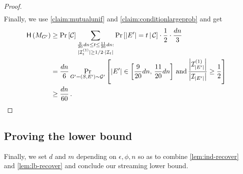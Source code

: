 \documentclass[epsfig,letter,11pt]{article}
\numberwithin{equation}{section}
\newcommand{\I}{\mathcal{I}}
\newcommand*{\entropy}{\textup{\textsf{H}}}
\begin{document}
\begin{proof}
\begin{align*}
		\end{align*}
		Finally, we use \cref{claim:mutualunif} and  \cref{claim:conditionlargeprob} and get
		\begin{align*}
			 	\entropy\left(M_{G'}\right) & \ge \Pr\left[  \mathcal{C} \right]     \sum_{\substack{\frac{9}{20}dn \le t \le  \frac{11}{20}dn:\\ |\mathcal{I}^{(1)}_{t}| \ge {1}/{2} \cdot |\mathcal{I}_t| } } \Pr\left[|E'|=t \, \middle| \, \mathcal{C} \right] \cdot \frac{1}{2} \cdot  \frac{dn}{3}  \\
			 	& =  \frac{dn}{6} \Pr_{G'=(S,E') \sim \mathcal{G}'}\left[  |E'| \in \left[\frac{9}{20}dn , \, \frac{11}{20}dn\right]  \, \mathrm{ and } \, \frac{\left|\I_{|E'|}^{(1)}\right|}{\left|\I_{|E'| }\right|} \ge  \frac{1}{2}\right] \\
			 	& \ge  \frac{dn}{60} \, .
	\end{align*}
\end{proof}

\subsection{Proving  the lower bound}
\label{subsec:lbproof}
Finally, we set $d$ and $m$ depending on $\epsilon,\phi,n$ so as to combine \cref{lem:ind-recover} and \cref{lem:lb-recover} and conclude our streaming lower bound.
\lb*
\end{document}
